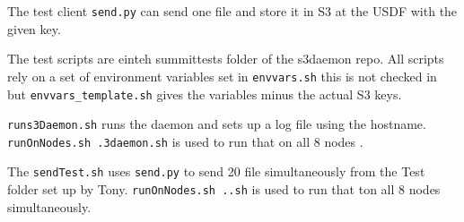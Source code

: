 The test client  {\tt send.py} can send one file and store it in S3 at the USDF with the given key.

The test scripts are einteh summittests folder of the s3daemon repo.
All scripts rely on a set of environment variables set in {\tt envvars.sh} this is not checked in but {\tt envvars_template.sh} gives the variables minus the actual S3 keys.

{\tt runs3Daemon.sh} runs the daemon and sets up a log file using the hostname.
 {\tt runOnNodes.sh .\runs3daemon.sh} is used to run that on all 8 nodes .

The {\tt sendTest.sh} uses {\tt send.py} to send 20 file simultaneously from the Test folder set up by Tony.
 {\tt runOnNodes.sh .\sendTest.sh} is used to run that ton all 8 nodes simultaneously.




